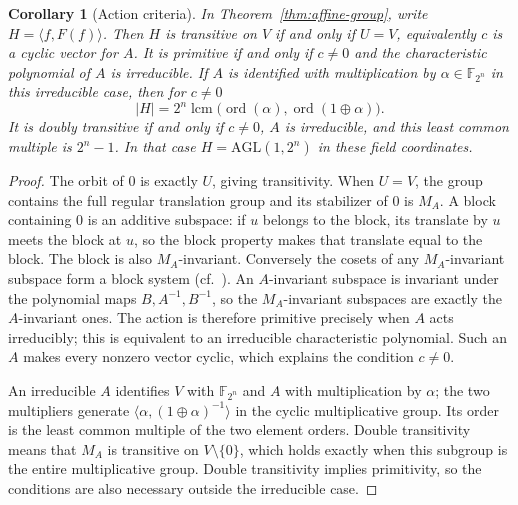 \documentclass[11pt]{article}
\newtheorem{corollary}[theorem]{Corollary}
\begin{document}
\begin{corollary}[Action criteria]\label{cor:affine-actions}
In Theorem~\ref{thm:affine-group}, write $H=\langle f,F(f)\rangle$.
Then $H$ is transitive on $V$ if and only if $U=V$, equivalently $c$ is a
cyclic vector for $A$. It is primitive if and only if $c\ne0$ and the
characteristic polynomial of $A$ is irreducible.
If $A$ is identified with multiplication by $\alpha\in\mathbb F_{2^n}$
in this irreducible case, then for $c\ne0$
\[
|H|=2^n\operatorname{lcm}\bigl(\operatorname{ord}(\alpha),
             \operatorname{ord}(1\oplus\alpha)\bigr).
\]
It is doubly transitive if and only if $c\ne0$, $A$ is irreducible, and
this least common multiple is $2^n-1$. In that case
$H=\mathrm{AGL}(1,2^n)$ in these field coordinates.
\end{corollary}
\begin{proof}
The orbit of $0$ is exactly $U$, giving transitivity.
When $U=V$, the group contains the full regular translation group and its
stabilizer of $0$ is $M_A$. A block containing $0$ is an additive subspace:
if $u$ belongs to the block, its translate by $u$ meets the block at $u$,
so the block property makes that translate equal to the block.
The block is also $M_A$-invariant. Conversely the cosets of any
$M_A$-invariant subspace form a block system (cf.\ \cite{DM}).
An $A$-invariant subspace is invariant under the polynomial maps
$B,A^{-1},B^{-1}$, so the $M_A$-invariant subspaces are exactly the
$A$-invariant ones. The action is therefore primitive precisely when
$A$ acts irreducibly; this is equivalent to an irreducible characteristic
polynomial. Such an $A$ makes every nonzero vector cyclic, which explains
the condition $c\ne0$.

An irreducible $A$ identifies $V$ with $\mathbb F_{2^n}$ and $A$ with
multiplication by $\alpha$; the two multipliers generate
$\langle\alpha,(1\oplus\alpha)^{-1}\rangle$ in the cyclic multiplicative group.
Its order is the least common multiple of the two element orders.
Double transitivity means that $M_A$ is transitive on $V\setminus\{0\}$,
which holds exactly when this subgroup is the entire multiplicative group.
Double transitivity implies primitivity, so the conditions are also necessary
outside the irreducible case.
\end{proof}
\end{document}
